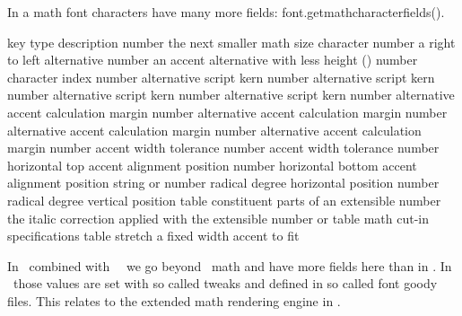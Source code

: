 {In a math font characters have many more fields: \showenginekeylist
{font.getmathcharacterfields()}.

\starttabulate[|l|l|pl|]
\FL
\BC key                      \BC type    \BC description \NC \NR
\ML
\NC {}          \NC number  \NC the next smaller math size character               \NC \NR
\NC {}           \NC number  \NC a right to left alternative                        \NC \NR
\NC {}       \NC number  \NC an accent alternative with less height (\OPENTYPE) \NC \NR
\NC {}             \NC number  \NC {} character index               \NC \NR
\HL
\NC {}          \NC number  \NC alternative script kern \NC \NR
\NC {}         \NC number  \NC alternative script kern \NC \NR
\NC {}       \NC number  \NC alternative script kern \NC \NR
\NC {}      \NC number  \NC alternative script kern \NC \NR
\HL
\NC {}        \NC number  \NC alternative accent calculation margin \NC \NR
\NC {}      \NC number  \NC alternative accent calculation margin \NC \NR
\NC {}       \NC number  \NC alternative accent calculation margin \NC \NR
\NC {}      \NC number  \NC alternative accent calculation margin \NC \NR
\HL
\NC {}     \NC number  \NC accent width tolerance \NC \NR
\NC {}  \NC number  \NC accent width tolerance \NC \NR
\HL
\NC {}        \NC number  \NC horizontal top accent alignment position    \NC \NR
\NC {}     \NC number  \NC horizontal bottom accent alignment position \NC \NR
\HL
\NC {}    \NC string  \NC {} or       \NC \NR
\NC {}     \NC number  \NC radical degree horizontal position \NC \NR
\NC {}     \NC number  \NC radical degree vertical position   \NC \NR
\HL
\NC {}            \NC table   \NC constituent parts of an extensible                \NC \NR
\NC {}      \NC number  \NC the italic correction applied with the extensible \NC \NR
\NC {} \NC number  \NC {} or             \NC \NR
\HL
\NC {}        \NC table   \NC math cut-in specifications \NC \NR
\HL
\NC {}       \NC table   \NC stretch a fixed width accent to fit \NC \NR
\LL
\stoptabulate

In \LUAMETATEX\ combined with \CONTEXT\ \MKXL\ we go beyond \OPENTYPE\ math and
have more fields here than in \LUATEX. In \CONTEXT\ those values are set with so
called tweaks and defined in so called font goody files. This relates to the
extended math rendering engine in \LUAMETATEX.

}
